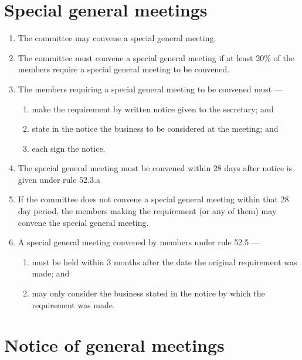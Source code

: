 \hypertarget{special-general-meetings}{%
\section{Special general meetings}\label{special-general-meetings}}

\begin{enumerate}

\item The committee may convene a special general meeting.
\item The committee must convene a special general meeting if at least 20\% of the members require a special general meeting to be convened.
\item The members requiring a special general meeting to be convened must ---

  \begin{enumerate}
  
  \item make the requirement by written notice given to the secretary; and
  \item state in the notice the business to be considered at the meeting; and
  \item each sign the notice.
  \end{enumerate}
\item The special general meeting must be convened within 28 days after notice is given under rule 52.3.a
\item If the committee does not convene a special general meeting within that 28 day period, the members making the requirement (or any of them) may convene the special general meeting.
\item A special general meeting convened by members under rule 52.5 ---

  \begin{enumerate}
  
  \item must be held within 3 months after the date the original requirement was made; and
  \item may only consider the business stated in the notice by which the requirement was made.
  \end{enumerate}
\end{enumerate}

\hypertarget{notice-of-general-meetings}{%
\section{Notice of general meetings}\label{notice-of-general-meetings}}

